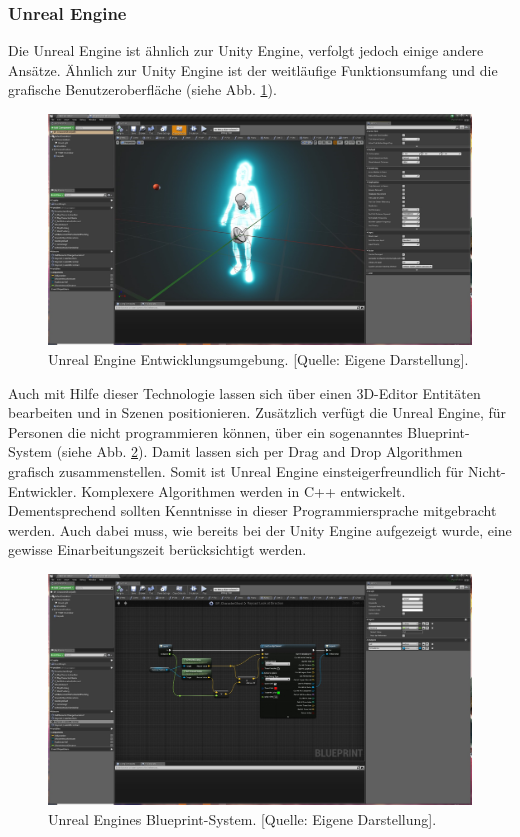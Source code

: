 \documentclass[a4paper,12pt,oneside]{article}
\begin{document}
      \subsubsection{Unreal Engine}
        Die Unreal Engine ist ähnlich zur 
        Unity Engine, verfolgt jedoch einige andere Ansätze. Ähnlich zur
        Unity Engine ist der weitläufige Funktionsumfang und die grafische
        Benutzeroberfläche (siehe Abb. \ref{fig:unreal1}). 
        \begin{figure}[h]
          \centering
          \includegraphics[scale=0.35]{img/unreal1.png}
          \caption[Unreal Engine Entwicklungsumgebung.]{Unreal Engine Entwicklungsumgebung. [Quelle: Eigene Darstellung].}
          \label{fig:unreal1}
        \end{figure}
        Auch mit Hilfe dieser Technologie lassen sich über 
        einen 3D-Editor Entitäten bearbeiten und in Szenen positionieren.
        Zusätzlich verfügt die Unreal Engine,
        für Personen die nicht programmieren können, über ein sogenanntes Blueprint-System
        (siehe Abb. \ref{fig:unreal2}).
        Damit lassen sich per Drag and Drop Algorithmen grafisch zusammenstellen. Somit
        ist Unreal Engine einsteigerfreundlich für Nicht-Entwickler.
        Komplexere Algorithmen werden in C++ entwickelt. Dementsprechend sollten 
        Kenntnisse in dieser Programmiersprache mitgebracht werden. 
        Auch dabei muss, wie bereits bei der Unity Engine aufgezeigt
        wurde, eine gewisse Einarbeitungszeit berücksichtigt werden.
        \begin{figure}[h]
          \centering
          \includegraphics[scale=0.35]{img/unreal2.png}
          \caption[Unreal Engines Blueprint-System.]{Unreal Engines Blueprint-System. [Quelle: Eigene Darstellung].}
          \label{fig:unreal2}
        \end{figure} \\
\end{document}
